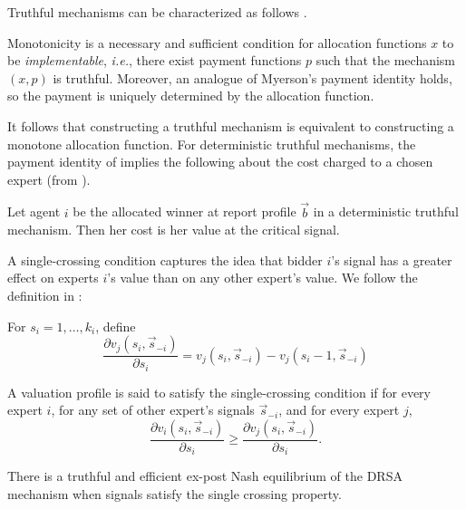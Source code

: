 Truthful mechanisms can be characterized as follows \citep{roughgarden2016optimal}.

\begin{prop}\label{prop:char-ic}
	Monotonicity is a necessary and sufficient condition for allocation functions $x$ to be \emph{implementable}, {\sl i.e.}, there exist payment functions $p$ such that the mechanism $(x,p)$ is truthful.  Moreover, an analogue of Myerson's payment identity holds, so the payment is uniquely determined by the allocation function.%
\end{prop}

It follows that constructing a truthful mechanism is equivalent to constructing a monotone allocation function.
For deterministic truthful mechanisms, the payment identity of  implies the following about the cost charged to a chosen expert (from \citep{eden2018interdependent}).

\begin{prop}\label{prop:deterministic_payment}
	Let agent $i$ be the allocated winner at report profile $\vec{b}$ in a deterministic truthful mechanism. Then her cost is her value at the critical signal.
\end{prop}


A single-crossing condition captures the idea that bidder $i$'s signal has a greater effect on experts $i$'s value than on any other expert's value. We follow the definition in \citep{eden2018interdependent}:

For $s_i = 1, \ldots, k_i$, define $$\frac{\partial v_j(s_i, \vec{s}_{-i})}{\partial s_i} = v_j(s_i, \vec{s}_{-i}) - v_j(s_i - 1, \vec{s}_{-i})$$

\begin{defn}
	A valuation profile is said to satisfy the single-crossing condition if for every expert $i$, for any set of other expert's  signals $\vec{s}_{-i}$, and for every expert $j$, $$\frac{\partial v_i(s_i, \vec{s}_{-i})}{\partial s_i} \geq \frac{\partial v_j(s_i, \vec{s}_{-i})}{\partial s_i}.$$
\end{defn}



\begin{thm}
	There is a truthful and efficient ex-post Nash equilibrium of the DRSA mechanism when signals satisfy the single crossing property.
\end{thm}

